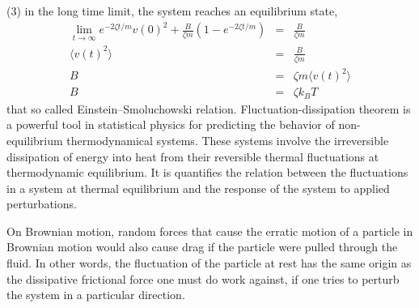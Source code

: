 \documentclass[paper=a4, fontsize=11pt]{scrartcl}
\numberwithin{equation}{section} %
\numberwithin{figure}{section} %
\numberwithin{table}{section} %
\begin{document}
(3) in the long time limit, the system reaches an equilibrium state,
\begin{eqnarray*}
 \lim_{t \rightarrow \infty} e^{-2\zeta t/m}v(0)^2 + \frac{B}{\zeta m} \left(1-e^{-2\zeta t/m} \right) &=& \frac{B}{\zeta m} \\
 \langle v(t)^2 \rangle &=& \frac{B}{\zeta m}\\
 B &=& \zeta m \langle v(t)^2 \rangle \\
 B &=& \zeta k_B T 
\end{eqnarray*}
that so called Einstein\---Smoluchowski relation. Fluctuation-dissipation theorem is a powerful tool in statistical physics for predicting the behavior of non-equilibrium thermodynamical systems. These systems involve the irreversible dissipation of energy into heat from their reversible thermal fluctuations at thermodynamic equilibrium.  It is quantifies the relation between the fluctuations in a system at thermal equilibrium and the response of the system to applied perturbations.

On Brownian motion, random forces that cause the erratic motion of a particle in Brownian motion would also cause drag if the particle were pulled through the fluid. In other words, the fluctuation of the particle at rest has the same origin as the dissipative frictional force one must do work against, if one tries to perturb the system in a particular direction.
\end{document}
